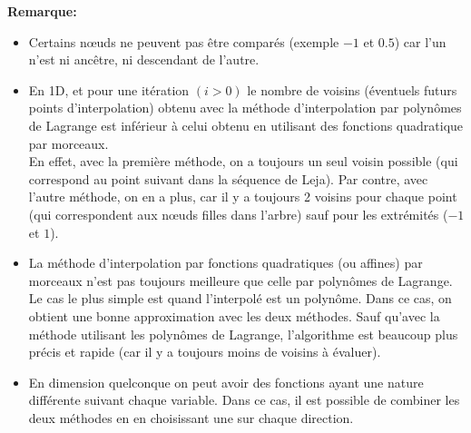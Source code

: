\textbf{Remarque:}
\begin{itemize}
\item Certains nœuds ne peuvent pas être comparés (exemple $-1$ et $0.5$) car l'un n'est ni ancêtre, ni descendant de l'autre.\\
\item En 1D, et pour une itération $(i>0)$ le nombre de voisins (éventuels futurs points d'interpolation) obtenu avec la méthode d'interpolation par polynômes de Lagrange est inférieur à celui obtenu en utilisant des fonctions quadratique par morceaux. \\
En effet, avec la première méthode, on a toujours un seul voisin possible (qui correspond au point suivant dans la séquence de Leja). Par contre, avec l'autre méthode, on en a plus, car il y a toujours 2 voisins pour chaque point (qui correspondent aux nœuds filles dans l'arbre) sauf pour les extrémités ($-1$ et $1$).
\item La méthode d'interpolation par fonctions quadratiques (ou affines) par morceaux n'est pas toujours meilleure que celle par polynômes de Lagrange. Le cas le plus simple est quand l'interpolé est un polynôme. Dans ce cas, on obtient une bonne approximation avec les deux méthodes. Sauf qu'avec la méthode utilisant les polynômes de Lagrange, l'algorithme est beaucoup plus précis et rapide (car il y a toujours moins de voisins à évaluer).
\item En dimension quelconque on peut avoir des fonctions ayant une nature différente suivant chaque variable. Dans ce cas, il est possible de combiner les deux méthodes en en choisissant une sur chaque direction.
\end{itemize}

